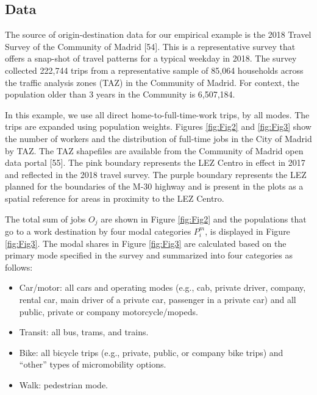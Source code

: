 \documentclass[10pt,letterpaper]{article}
\providecommand{\tightlist}{%
  \setlength{\itemsep}{0pt}\setlength{\parskip}{0pt}}
\begin{document}
\hypertarget{data}{%
\subsection{Data}\label{data}}

The source of origin-destination data for our empirical example is the
2018 Travel Survey of the Community of Madrid {[}54{]}. This is a
representative survey that offers a snap-shot of travel patterns for a
typical weekday in 2018. The survey collected 222,744 trips from a
representative sample of 85,064 households across the traffic analysis
zones (TAZ) in the Community of Madrid. For context, the population
older than 3 years in the Community is 6,507,184.

In this example, we use all direct home-to-full-time-work trips, by all
modes. The trips are expanded using population weights. Figures
\ref{fig:Fig2} and \ref{fig:Fig3} show the number of workers and the
distribution of full-time jobs in the City of Madrid by TAZ. The TAZ
shapefiles are available from the Community of Madrid open data portal
{[}55{]}. The pink boundary represents the LEZ Centro in effect in 2017
and reflected in the 2018 travel survey. The purple boundary represents
the LEZ planned for the boundaries of the M-30 highway and is present in
the plots as a spatial reference for areas in proximity to the LEZ
Centro.

The total sum of jobs \(O_j\) are shown in Figure \ref{fig:Fig2} and the
populations that go to a work destination by four modal categories
\(P^m_i\), is displayed in Figure \ref{fig:Fig3}. The modal shares in
Figure \ref{fig:Fig3} are calculated based on the primary mode specified
in the survey and summarized into four categories as follows:

\begin{itemize}
\tightlist
\item
  Car/motor: all cars and operating modes (e.g., cab, private driver,
  company, rental car, main driver of a private car, passenger in a
  private car) and all public, private or company motorcycle/mopeds.
\item
  Transit: all bus, trams, and trains.
\item
  Bike: all bicycle trips (e.g., private, public, or company bike trips)
  and ``other'' types of micromobility options.
\item
  Walk: pedestrian mode.
\end{itemize}
\end{document}
